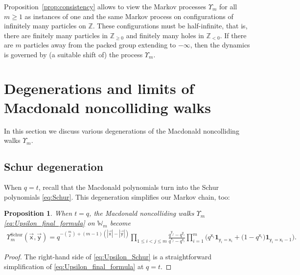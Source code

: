 \documentclass[pdftex]{sigma}
\numberwithin{equation}{section}
\newtheorem{Proposition}[Theorem]{Proposition}
{ \theoremstyle{definition}
\newtheorem{Definition}[Theorem]{Definition}}
\begin{document}
Proposition~\ref{prop:consistency}
allows to view the Markov processes $\Upsilon_m$ for all $m\ge1$
as instances of one and the same Markov process on configurations
of
infinitely many particles on $\mathbb{Z}$.
These configurations must be half-infinite, that is,
there are finitely many particles in $\mathbb{Z}_{\ge0}$
and finitely many holes in $\mathbb{Z}_{<0}$.
If there are $m$ particles away from the packed group
extending to $-\infty$, then the dynamics is governed by
(a suitable shift of) the process $\Upsilon_m$.

\section{Degenerations and limits of Macdonald noncolliding walks}
\label{sec:properties_of_our_walks}

In this section we discuss various
degenerations of the Macdonald noncolliding walks $\Upsilon_m$.

\subsection{Schur degeneration}

When $q=t$, recall that the Macdonald polynomials turn into the Schur polynomials
\eqref{eq:Schur}. This degeneration simplifies our Markov chain, too:

\begin{Proposition}
	\label{prop:Schur_degeneration}
	When $t=q$, the Macdonald noncolliding walks
	$\Upsilon_m$
	\eqref{eq:Upsilon_final_formula}
	on $\mathbb{W}_m$ become
	\begin{gather}\label{eq:Upsilon_Schur}
		\Upsilon_m^{\mathrm{Schur}}(\vec{\mathsf{x}},\vec{\mathsf{y}})
		=
		q^{-\binom m2+(m-1)(|\vec{\mathsf{x}}|-|\vec{\mathsf{y}}|)}
		\!\prod_{1\le i<j\le m}
		\frac
		{
			q^{\mathsf{y}_j}-q^{\mathsf{y}_i}
		}
		{
			q^{\mathsf{x}_j}-q^{\mathsf{x}_i}
		}
		\prod_{i=1}^{m}
		\big( q^{\mathsf{x}_i}\mathbf{1}_{\mathsf{y}_i=\mathsf{x}_i}+
		\big(1-q^{\mathsf{x}_i}\big)\mathbf{1}_{\mathsf{y}_i=\mathsf{x}_i-1}\big)
		.\!\!\!
	\end{gather}
\end{Proposition}
\begin{proof}
	The
	right-hand side of
	\eqref{eq:Upsilon_Schur}
	is a straightforward simplification of \eqref{eq:Upsilon_final_formula}
	at $q=t$.
\end{proof}
\end{document}
